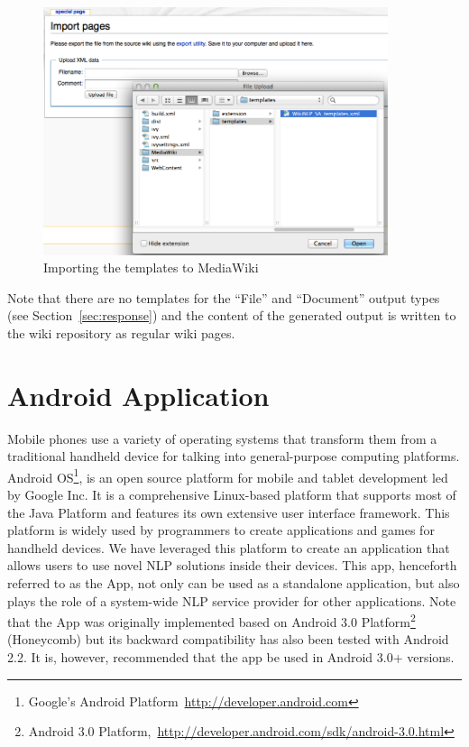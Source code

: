 \begin{figure}
\centering
\includegraphics[width=0.9\textwidth]{pictures/wiki_template_import.png}
\caption{Importing the \sa templates to MediaWiki}
\label{fig:wiki_template_import}
\end{figure}

Note that there are no templates for the ``File'' and ``Document'' output types (see Section~\ref{sec:response}) and the content of the generated output is written to the wiki repository as regular wiki pages.


\section{Android Application}
Mobile phones use a variety of operating systems that transform them from a traditional handheld device for talking into general-purpose computing platforms. Android OS\footnote{Google's Android Platform~\url{http://developer.android.com}}, is an open source platform for mobile and tablet development led by Google Inc. It is a comprehensive Linux-based platform that supports most of the Java Platform and features its own extensive user interface framework. This platform is widely used by programmers to create applications and games for handheld devices. We have leveraged this platform to create an application that allows users to use novel NLP solutions inside their devices. This app, henceforth referred to as the \sa App, not only can be used as a standalone application, but also plays the role of a system-wide NLP service provider for other applications. Note that the \sa App was originally implemented based on Android 3.0 Platform\footnote{Android 3.0 Platform,~\url{http://developer.android.com/sdk/android-3.0.html}} (Honeycomb) but its backward compatibility has also been tested with Android 2.2. It is, however, recommended that the app be used in Android 3.0+ versions.

